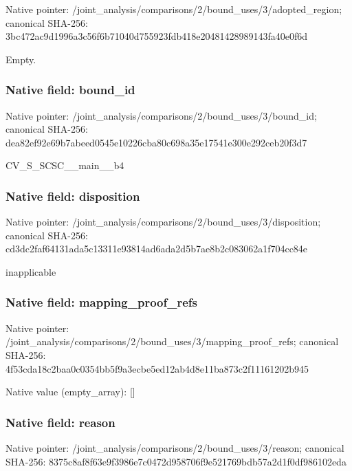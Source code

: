 \documentclass[10pt,a4paper]{article}
\begin{document}
Native pointer: /joint\_analysis/comparis\allowbreak{}ons/2/bound\_uses/3/adopt\allowbreak{}ed\_region; canonical SHA-256: 3bc472ac9d1996a3c56f6b71\allowbreak{}040d755923fdb418e2048142\allowbreak{}8989143fa40e0f6d


Empty.


\subsubsection{Native field: bound\_id}


Native pointer: /joint\_analysis/comparis\allowbreak{}ons/2/bound\_uses/3/bound\allowbreak{}\_id; canonical SHA-256: dea82ef92e69b7abeed0545e\allowbreak{}10226cba80c698a35e17541e\allowbreak{}300e292ceb20f3d7


CV\_S\_SCSC\_\_main\_\_b4


\subsubsection{Native field: disposition}


Native pointer: /joint\_analysis/comparis\allowbreak{}ons/2/bound\_uses/3/dispo\allowbreak{}sition; canonical SHA-256: cd3dc2faf64131ada5c13311\allowbreak{}e93814ad6ada2d5b7ae8b2c0\allowbreak{}83062a1f704cc84e


inapplicable


\subsubsection{Native field: mapping\_proof\_refs}


Native pointer: /joint\_analysis/comparis\allowbreak{}ons/2/bound\_uses/3/mappi\allowbreak{}ng\_proof\_refs; canonical SHA-256: 4f53cda18c2baa0c0354bb5f\allowbreak{}9a3ecbe5ed12ab4d8e11ba87\allowbreak{}3c2f11161202b945



Native value (empty\_array): []



\subsubsection{Native field: reason}


Native pointer: /joint\_analysis/comparis\allowbreak{}ons/2/bound\_uses/3/reaso\allowbreak{}n; canonical SHA-256: 8375c8af8f63e9f3986e7c04\allowbreak{}72d958706f9e521769bdb57a\allowbreak{}2d1f0df986102eda
\end{document}
